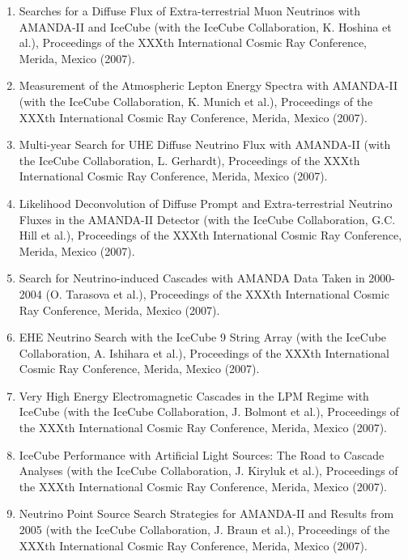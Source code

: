\begin{enumerate}
\item Searches for a Diffuse Flux of Extra-terrestrial Muon Neutrinos with AMANDA-II and IceCube (with the IceCube Collaboration, K. Hoshina et al.), Proceedings of the XXXth International Cosmic Ray Conference, Merida, Mexico (2007).

\item Measurement of the Atmospheric Lepton Energy Spectra with AMANDA-II (with the IceCube Collaboration, K. Munich et al.), Proceedings of the XXXth International Cosmic Ray Conference, Merida, Mexico (2007).

\item Multi-year Search for UHE Diffuse Neutrino Flux with AMANDA-II (with the IceCube Collaboration, L. Gerhardt), Proceedings of the XXXth International Cosmic Ray Conference, Merida, Mexico (2007).

\item Likelihood Deconvolution of Diffuse Prompt and Extra-terrestrial Neutrino Fluxes in the AMANDA-II Detector (with the IceCube Collaboration, G.C. Hill et al.), Proceedings of the XXXth International Cosmic Ray Conference, Merida, Mexico (2007).

\item Search for Neutrino-induced Cascades with AMANDA Data Taken in 2000-2004 (O. Tarasova et al.), Proceedings of the XXXth International Cosmic Ray Conference, Merida, Mexico (2007).

\item EHE Neutrino Search with the IceCube 9 String Array (with the IceCube Collaboration, A. Ishihara et al.), Proceedings of the XXXth International Cosmic Ray Conference, Merida, Mexico (2007).

\item Very High Energy Electromagnetic Cascades in the LPM Regime with IceCube (with the IceCube Collaboration, J. Bolmont et al.), Proceedings of the XXXth International Cosmic Ray Conference, Merida, Mexico (2007).

\item IceCube Performance with Artificial Light Sources: The Road to Cascade Analyses (with the IceCube Collaboration, J. Kiryluk et al.), Proceedings of the XXXth International Cosmic Ray Conference, Merida, Mexico (2007).

\item Neutrino Point Source Search Strategies for AMANDA-II and Results from 2005 (with the IceCube Collaboration, J. Braun et al.), Proceedings of the XXXth International Cosmic Ray Conference, Merida, Mexico (2007).


\end{enumerate}
